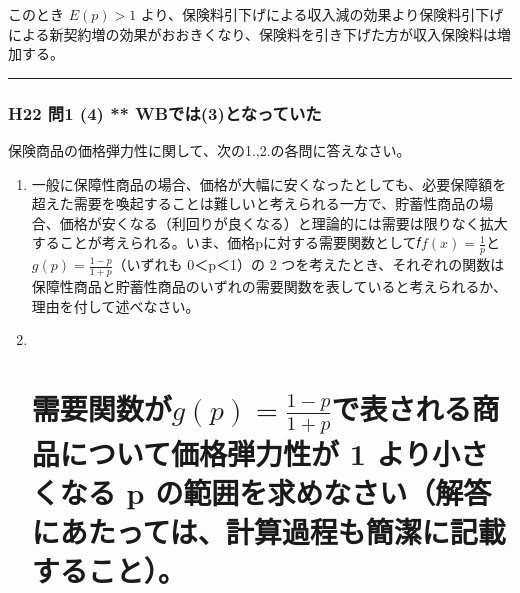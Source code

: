 \documentclass[
]{article}
\begin{document}
このとき \(E(p)\gt 1\)
より、保険料引下げによる収入減の効果より保険料引下げによる新契約増の効果がおおきくなり、保険料を引き下げた方が収入保険料は増加する。

\begin{center}\rule{0.5\linewidth}{0.5pt}\end{center}

\hypertarget{h22-ux554f1-4-wbux3067ux306f3ux3068ux306aux3063ux3066ux3044ux305f}{%
\subsubsection{H22 問1 (4) **
WBでは(3)となっていた}\label{h22-ux554f1-4-wbux3067ux306f3ux3068ux306aux3063ux3066ux3044ux305f}}

保険商品の価格弾力性に関して、次の1.,2.の各問に答えなさい。

\begin{enumerate}
\def\labelenumi{\arabic{enumi}.}
\item
  一般に保障性商品の場合、価格が大幅に安くなったとしても、必要保障額を超えた需要を喚起することは難しいと考えられる一方で、貯蓄性商品の場合、価格が安くなる（利回りが良くなる）と理論的には需要は限りなく拡大することが考えられる。いま、価格pに対する需要関数として𝑓\(f(x)=\frac{1}{p}\)と\(g(p)=\frac{1-p}{1+p}\)（いずれも
  0＜p＜1）の 2
  つを考えたとき、それぞれの関数は保障性商品と貯蓄性商品のいずれの需要関数を表していると考えられるか、理由を付して述べなさい。
\item ~
  \hypertarget{ux9700ux8981ux95a2ux6570ux304cgpfrac1-p1pux3067ux8868ux3055ux308cux308bux5546ux54c1ux306bux3064ux3044ux3066ux4fa1ux683cux5f3eux529bux6027ux304c-1-ux3088ux308aux5c0fux3055ux304fux306aux308b-p-ux306eux7bc4ux56f2ux3092ux6c42ux3081ux306aux3055ux3044ux89e3ux7b54ux306bux3042ux305fux3063ux3066ux306fux8a08ux7b97ux904eux7a0bux3082ux7c21ux6f54ux306bux8a18ux8f09ux3059ux308bux3053ux3068}{%
  \section{\texorpdfstring{需要関数が\(g(p)=\frac{1-p}{1+p}\)で表される商品について価格弾力性が
  1 より小さくなる p
  の範囲を求めなさい（解答にあたっては、計算過程も簡潔に記載すること）。}{需要関数がg(p)=\textbackslash frac\{1-p\}\{1+p\}で表される商品について価格弾力性が 1 より小さくなる p の範囲を求めなさい（解答にあたっては、計算過程も簡潔に記載すること）。}}\label{ux9700ux8981ux95a2ux6570ux304cgpfrac1-p1pux3067ux8868ux3055ux308cux308bux5546ux54c1ux306bux3064ux3044ux3066ux4fa1ux683cux5f3eux529bux6027ux304c-1-ux3088ux308aux5c0fux3055ux304fux306aux308b-p-ux306eux7bc4ux56f2ux3092ux6c42ux3081ux306aux3055ux3044ux89e3ux7b54ux306bux3042ux305fux3063ux3066ux306fux8a08ux7b97ux904eux7a0bux3082ux7c21ux6f54ux306bux8a18ux8f09ux3059ux308bux3053ux3068}}
\end{enumerate}
\end{document}
